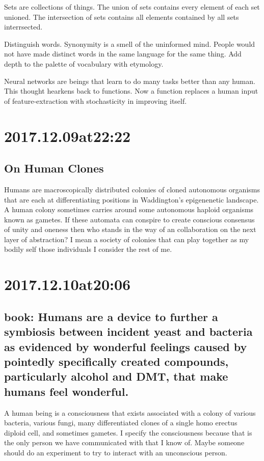 \begin{enumerate}
\begin{enumerate}
Sets are collections of things.
The union of sets contains every element of each set unioned.
The intersection of sets contains all elements contained by all sets interrsected.

Distinguish words.
Synonymity is a smell of the uninformed mind.
People would not have made distinct words in the same language for the same thing.
Add depth to the palette of vocabulary with etymology.

Neural networks are beings that learn to do many tasks better than any human.
This thought hearkens back to functions. Now a function replaces a human input of feature-extraction with stochasticity in improving itself.

\section*{ 2017.12.09at22:22 }
\subsection*{ On Human Clones }
Humans are macroscopically distributed colonies of cloned autonomous organisms that are each at differentiating positions in Waddington's epigenenetic landscape. A human colony sometimes carries around some autonomous haploid organisms known as gametes. If these automata can conspire to create conscious consensus of unity and oneness then who stands in the way of an collaboration on the next layer of abstraction? I mean a society of colonies that can play together as my bodily self those individuals I consider the rest of me.

\section*{ 2017.12.10at20:06 }
\subsection*{ book: Humans are a device to further a symbiosis between incident yeast and bacteria as evidenced by wonderful feelings caused by pointedly specifically created compounds, particularly alcohol and DMT, that make humans feel wonderful. }
A human being is a consciousness that exists associated with a colony of various bacteria, various fungi, many differentiated clones of a single homo erectus diploid cell, and sometimes gametes. I specify the consciousness because that is the only person we have communicated with that I know of. Maybe someone should do an experiment to try to interact with an unconscious person.


\end{enumerate}
\end{enumerate}

